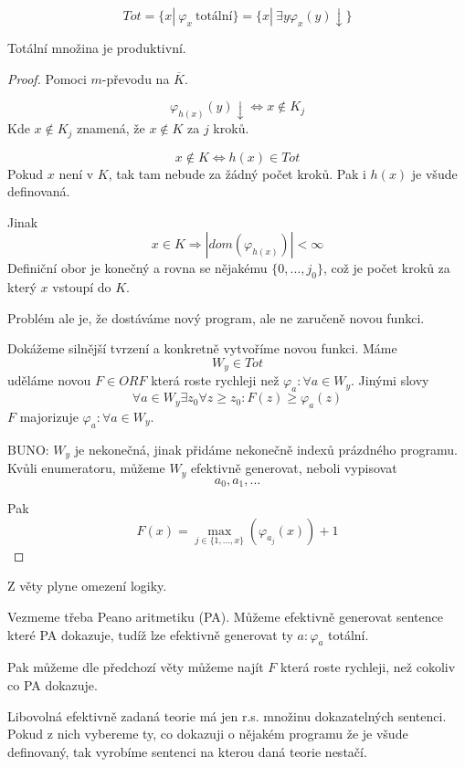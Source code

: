 \begin{definition}\label{tot_mn}
	\[ Tot = \{ x |\ \varphi_x\ \text{totální} \} = \{ x |\ \exists y \varphi_x(y) \downarrow \} \]
\end{definition}
\begin{lemma}
	Totální množina je produktivní.
\end{lemma}
\begin{proof}
	Pomoci $m$-převodu na $\overline{K}$.

	\[ \varphi_{h(x)} (y) \downarrow \iff x \notin K_j \]
	Kde $x \notin K_j$ znamená, že $x \notin K$ za $j$ kroků.

	\[ x \notin K \iff h(x) \in Tot \]
	Pokud $x$ není v $K$, tak tam nebude za žádný počet kroků. Pak i $h(x)$ je všude definovaná.

	Jinak
	\[ x \in K \Rightarrow |dom(\varphi_{h(x)})| < \infty \]
	Definiční obor je konečný a rovna se nějakému $\{ 0, ..., j_0 \}$, což je počet kroků za který $x$ vstoupí do $K$.

	Problém ale je, že dostáváme nový program, ale ne zaručeně novou funkci.

	Dokážeme silnější tvrzení a konkretně vytvoříme novou funkci.
	Máme
	\[ W_y \in Tot \]
	uděláme novou $F \in ORF$ která roste rychleji než $\varphi_a: \forall a \in W_y$.
	Jinými slovy
	\[ \forall a \in W_y \exists z_0 \forall z \geq z_0: F(z) \geq \varphi_a(z) \]
	$F$ majorizuje $\varphi_a: \forall a \in W_y$.

	BUNO: $W_y$ je nekonečná, jinak přidáme nekonečně indexů prázdného programu.
	Kvůli enumeratoru, můžeme $W_y$ efektivně generovat, neboli vypisovat
	\[ a_0, a_1, \ldots \]

	Pak
	\[ F(x) = \max_{j \in \{ 1, \ldots, x \} } (\varphi_{a_j}(x)) + 1 \]
\end{proof}

\begin{consequence}
	Z věty plyne omezení logiky.

	Vezmeme třeba Peano aritmetiku (PA).
	Můžeme efektivně generovat sentence které PA dokazuje, tudíž lze efektivně generovat ty $a: \varphi_a$ totální.

	Pak můžeme dle předchozí věty můžeme najít $F$ která roste rychleji, než cokoliv co PA dokazuje.

	Libovolná efektivně zadaná teorie má jen r.s. množinu dokazatelných sentenci.
	Pokud z nich vybereme ty, co dokazuji o nějakém programu že je všude definovaný, tak vyrobíme sentenci na kterou daná teorie nestačí.
\end{consequence}
